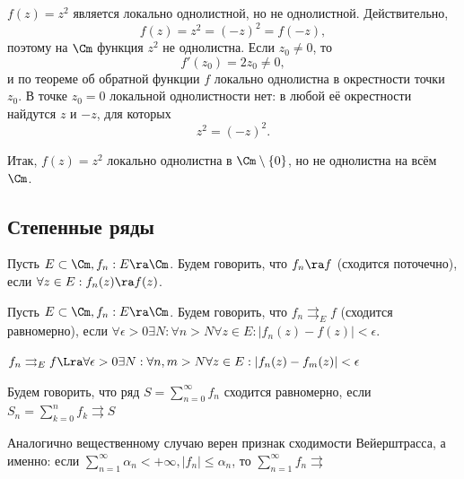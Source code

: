\begin{example}
    \(f(z)=z^2\) является локально однолистной, но не однолистной. Действительно,
    \[
        f(z)=z^2=(-z)^2=f(-z),
    \]
    поэтому на \(\Cm\) функция \(z^2\) не однолистна. Если \(z_0\ne 0\), то
    \[
        f'(z_0)=2z_0\ne 0,
    \]
    и по теореме об обратной функции \(f\) локально однолистна в окрестности точки \(z_0\). В точке \(z_0=0\) локальной однолистности нет: в любой её окрестности найдутся \(z\) и \(-z\), для которых
    \[
        z^2=(-z)^2.
    \]

    Итак, \(f(z)=z^2\) локально однолистна в \(\Cm\setminus\{0\}\), но не однолистна на всём \(\Cm\).
\end{example}

\subsection{Степенные ряды}

\begin{definition}
    Пусть \(E \subset \Cm, f_n: E \ra \Cm\). Будем говорить, что \(f_n \ra f\) (сходится поточечно), если \(\forall z \in E: f_n(z) \ra f(z)\).
\end{definition}

\begin{definition}
    Пусть \(E \subset \Cm, f_n: E \ra \Cm\). Будем говорить, что \(f_n \rightrightarrows_E f\) (сходится равномерно), если \(\forall \epsilon > 0\exists N: \forall n > N \forall z \in E: |f_n(z) - f(z)| < \epsilon\).
\end{definition}

\begin{note}
    \(f_n \rightrightarrows_E f \Lra \forall \epsilon > 0\exists N: \forall n, m > N \forall z \in E: |f_n(z) - f_m(z)| < \epsilon\)
\end{note}

\begin{definition}
    Будем говорить, что ряд \(S = \sum_{n = 0}^\infty f_n\) сходится равномерно, если \(S_n = \sum_{k = 0}^n f_k \rightrightarrows S\)
\end{definition}

\begin{note}
    Аналогично вещественному случаю верен признак сходимости Вейерштрасса, а именно: если \(\sum_{n = 1}^\infty \alpha_n < +\infty, |f_n| \le \alpha_n\), то \(\sum_{n = 1}^\infty f_n \rightrightarrows\)
\end{note}


